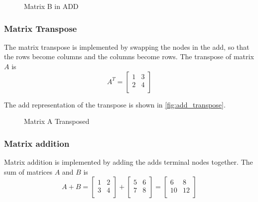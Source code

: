 \begin{figure}
    \centering
    \caption{Matrix B in ADD}
    \label{fig:add_matrix_b}
\end{figure}

\subsubsection{Matrix Transpose}
The matrix transpose is implemented by swapping the nodes in the \gls{add}, so that the rows become columns and the columns become rows.
The transpose of matrix $A$ is 
\[
A^T = \begin{bmatrix}
    1 & 3 \\
    2 & 4 \\
\end{bmatrix}
\]

The \gls{add} representation of the transpose is shown in \autoref{fig:add_transpose}.
\begin{figure}
    \centering
    
    \caption{Matrix A Transposed}
    \label{fig:add_transpose}
\end{figure}

\subsubsection{Matrix addition}
Matrix addition is implemented by adding the \glspl{add} terminal nodes together.
The sum of matrices $A$ and $B$ is
\[
A + B = \begin{bmatrix}
    1 & 2 \\
    3 & 4 \\
\end{bmatrix} + \begin{bmatrix}
    5 & 6 \\
    7 & 8 \\
\end{bmatrix} = \begin{bmatrix}
    6 & 8 \\
    10 & 12 \\
\end{bmatrix}
\]

